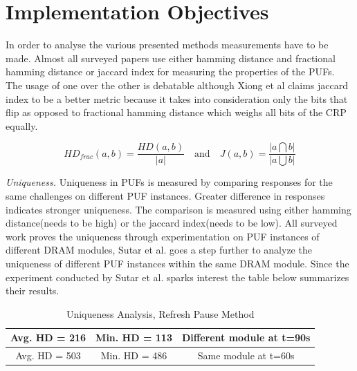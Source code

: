 \documentclass[journal, a4paper]{IEEEtran}
\begin{document}
\section{Implementation Objectives}
In order to analyse the various presented methods measurements have to be made. Almost all surveyed papers use either hamming distance and fractional hamming distance or jaccard index for measuring the properties of the PUFs.\cite{jaccard} The usage of one over the other is debatable although Xiong et al claims jaccard index to be a better metric because it takes into consideration only the bits that flip as opposed to fractional hamming distance which weighs all bits of the CRP equally. 

\[ HD_{frac}(a,b) = \dfrac{HD(a,b)}{|a|} \quad\text{and}\quad J(a,b) = \dfrac{| a \bigcap b |}{| a \bigcup b |} \]

\textit{Uniqueness.} Uniqueness in PUFs is measured by comparing responses for the same challenges on different PUF instances. Greater difference in responses indicates stronger uniqueness.  The comparison is measured using either hamming distance(needs to be high) or the jaccard index(needs to be low). All surveyed work proves the uniqueness through experimentation on PUF instances of different DRAM modules, Sutar et al. goes a step further to analyze the uniqueness of different PUF instances within the same DRAM module. Since the experiment conducted by Sutar et al. sparks interest the table below summarizes their results.

\begin{table}[!hbt]
    \begin{center}
    \caption{Uniqueness Analysis, Refresh Pause Method}
    \label{tab:simParameters}
    \begin{tabular}{|c|c|c|}
        \hline

        Avg. HD = 216 & Min. HD = 113 & Different module at t=90s \\
        \hline
        Avg. HD = 503 & Min. HD = 486 & Same module at t=60s \\
        \hline

    \end{tabular}
    \end{center}
\end{table}
\end{document}
